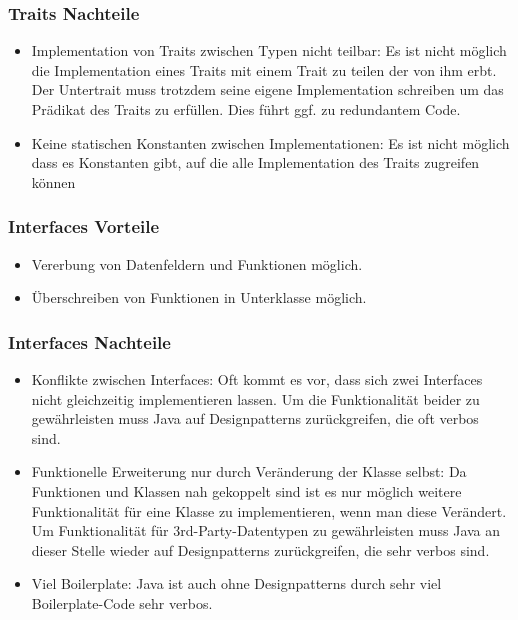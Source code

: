 \documentclass[a4paper, 1ppt]{article}
\begin{document}
\subsubsection{Traits Nachteile}
\begin{itemize}
	\item Implementation von Traits zwischen Typen nicht teilbar: Es ist nicht möglich die Implementation eines Traits mit einem Trait zu teilen der von ihm erbt. Der Untertrait muss trotzdem seine eigene Implementation schreiben um das Prädikat des Traits zu erfüllen. Dies führt ggf. zu redundantem Code.
	\item Keine statischen Konstanten zwischen Implementationen: Es ist nicht möglich dass es Konstanten gibt, auf die alle Implementation des Traits zugreifen können
\end{itemize}
\subsubsection{Interfaces Vorteile}
\begin{itemize}
	\item Vererbung von Datenfeldern und Funktionen möglich.
	\item Überschreiben von Funktionen in Unterklasse möglich.
\end{itemize}
\subsubsection{Interfaces Nachteile}
\begin{itemize}
	\item Konflikte zwischen Interfaces: Oft kommt es vor, dass sich zwei Interfaces nicht gleichzeitig implementieren lassen. Um die Funktionalität beider zu gewährleisten muss Java auf Designpatterns zurückgreifen, die oft verbos sind.
	\item Funktionelle Erweiterung nur durch Veränderung der Klasse selbst: Da Funktionen und Klassen nah gekoppelt sind ist es nur möglich weitere Funktionalität für eine Klasse zu implementieren, wenn man diese Verändert. Um Funktionalität für 3rd-Party-Datentypen zu gewährleisten muss Java an dieser Stelle wieder auf Designpatterns zurückgreifen, die sehr verbos sind.
	\item Viel Boilerplate: Java ist auch ohne Designpatterns durch sehr viel Boilerplate-Code sehr verbos.
\end{itemize}


\end{document}
